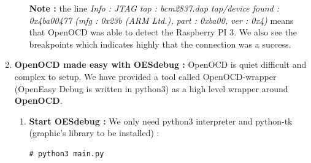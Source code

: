 \begin{enumerate}
\begin{enumerate}
	
	\textbf{\color{orange}Note :} the line \og \emph{Info : JTAG tap : bcm2837.dap tap/device found : 0x4ba00477 (mfg : 0x23b (ARM Ltd.), part :
0xba00, ver : 0x4)} \fg means that OpenOCD was able to detect the Raspberry PI 3. We also see the breakpoints which indicates highly that the connection was a success.
		\end{enumerate}
		
	
	
	\item \textbf{OpenOCD made easy with OESdebug : } OpenOCD is quiet difficult and complex to setup. We have provided a tool called \og OpenOCD-wrapper \fg (OpenEasy Debug is written in python3) as a high level wrapper around \textbf{OpenOCD}.\\
\begin{center}
\end{center}

	
	
	\begin{enumerate}
		\item \textbf{Start OESdebug : } We only need python3 interpreter and python-tk (graphic's library to be installed) :
		\begin{lstlisting}[style=BashInputStyle]
# python3 main.py
	\end{lstlisting}	
			

\end{enumerate}
\end{enumerate}
